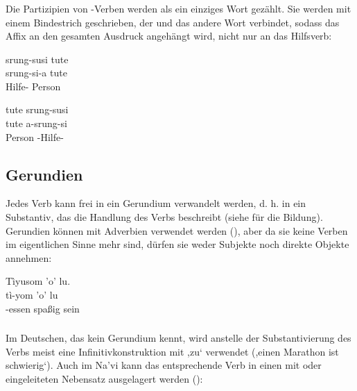 \subsubsection{} Die Partizipien von -Verben werden als ein einziges Wort gezählt. Sie werden mit einem Bindestrich geschrieben, der  und das andere Wort verbindet, sodass das Affix  an den gesamten Ausdruck angehängt wird, nicht nur an das Hilfsverb: \label{syn:participle:si-const}

\begin{interlin}
	\glll srung-susi tute \\
	srung-si-a tute \\
	Hilfe- Person \\
\end{interlin}

\begin{interlin}
	\glll tute srung-susi \\
	tute a-srung-si \\
	Person -Hilfe- \\
\end{interlin}

\subsection{Gerundien} Jedes Verb kann frei in ein Gerundium verwandelt werden, d. h. in ein Substantiv, das die Handlung des Verbs beschreibt (siehe  für die Bildung). Gerundien können mit Adverbien verwendet werden (), aber da sie keine Verben im eigentlichen Sinne mehr sind, dürfen sie weder Subjekte noch direkte Objekte annehmen:\label{syn:gerund}

\begin{interlin}
	\glll \Npawl{}Tìyusom 'o' lu. \\
	tì-yom 'o' lu \\
	-essen spaßig sein \\
\end{interlin}

\subsubsection{} Im Deutschen, das kein Gerundium kennt, wird anstelle der Substantivierung des Verbs meist eine Infinitivkonstruktion mit ,zu‘ verwendet (,einen Marathon  ist schwierig‘). Auch im Na'vi kann das entsprechende Verb in einen mit  oder  eingeleiteten Nebensatz ausgelagert werden ():

